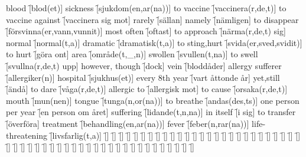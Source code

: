 \begin{questions}
\begin{multicols}{2}
        \question blood \f[blod(et)]
        \question sickness \f[sjukdom(en,ar(na))]
        \question to vaccine \f[vaccinera(r,de,t)]
        \question to vaccine against \f[vaccinera sig mot]
        \question rarely \f[sällan]
        \question namely \f[nämligen]
        \question to disappear \f[försvinna(er,vann,vunnit)]
        \question most often \f[oftast]
        \question to approach \f[närma(r,de,t) sig]
        \question normal \f[normal(t,a)]
        \question dramatic \f[dramatisk(t,a)]
        \question to sting,hurt \f[svida(er,sved,svidit)]
        \question to hurt \f[göra ont]
        \question area \f[område(t,\_,n)]
        \question swollen \f[svullen(t,na)]
        \question to swell \f[svullna(r,de,t) upp]
        \question however, though \f[dock]
        \question vein \f[bloddåder]
        \question allergy sufferer \f[allergiker(n)]
        \question hospital \f[sjukhus(et)]
        \question every 8th year \f[vart åttonde år]
        \question yet,still \f[ändå]
        \question to dare \f[våga(r,de,t)]
        \question allergic to \f[allergisk mot]
        \question to cause \f[orsaka(r,de,t)]
        \question mouth \f[mun(nen)]
        \question tongue \f[tunga(n,or(na))]
        \question to breathe \f[andas(des,ts)]
        \question one person per year \f[en person om året]
        \question suffering \f[lidande(t,n,na)]
        \question in itself \f[i sig]
        \question to transfer \f[överföra]
        \question treatment \f[behandling(en,ar(na))]
        \question fever \f[feber(n,rar(na))]
        \question life-threatening \f[livsfarlig(t,a)]
        \question  \f[]
        \question  \f[]
        \question  \f[]
        \question  \f[]
        \question  \f[]
        \question  \f[]
        \question  \f[]
        \question  \f[]
        \question  \f[]
        \question  \f[]
        \question  \f[]
        \question  \f[]
        \question  \f[]
        \question  \f[]
        \question  \f[]
        \question  \f[]
        \question  \f[]
        \question  \f[]
        \question  \f[]
        \question  \f[]
        \question  \f[]
        \question  \f[]
        \question  \f[]
        \question  \f[]
        \question  \f[]
        \question  \f[]
        \question  \f[]
        \question  \f[]
        \question  \f[]
        \question  \f[]
        \question  \f[]
        \question  \f[]
        \question  \f[]
        \question  \f[]
        \question  \f[]
        \question  \f[]
        \question  \f[]
        \question  \f[]
        \question  \f[]
        \question  \f[]
        \question  \f[]
        \question  \f[]
        \question  \f[]
        \question  \f[]
        \question  \f[]
        \question  \f[]
        \question  \f[]
        \question  \f[]
        \question  \f[]
        \question  \f[]
        \question  \f[]
        \question  \f[]
        \question  \f[]
    \end{multicols}
\end{questions}
